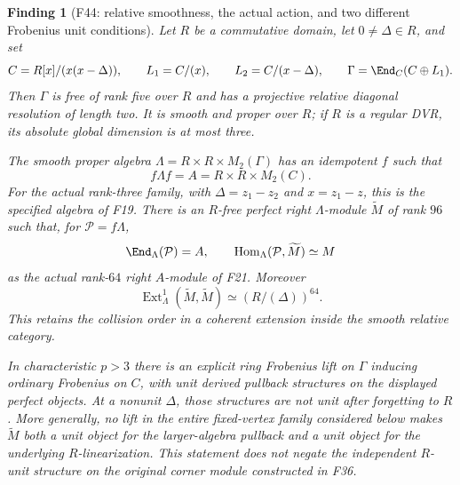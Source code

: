 \documentclass[11pt,a4paper]{article}
\newcommand{\fid}[1]{\textsf{#1}}\newcommand{\gate}[1]{\textsf{#1}}
\theoremstyle{named}\newtheorem{finding}{Finding}[section]
\theoremstyle{definition}\newtheorem{definition}[finding]{Definition}
\theoremstyle{remark}\newtheorem{remark}[finding]{Remark}
\begin{document}
\begin{finding}[\fid{F44}: relative smoothness, the actual action,
and two different Frobenius unit conditions]\label{f:relativeauslander}
Let $R$ be a commutative domain, let $0\ne\Delta\in R$, and set
\[
 C=R[x]/(x(x-\Delta)),\qquad L_1=C/(x),\qquad
 L_2=C/(x-\Delta),\qquad
 \Gamma=\End_C(C\oplus L_1).
\]
Then $\Gamma$ is free of rank five over $R$ and has a projective
relative diagonal resolution of length two. It is smooth and
proper over $R$; if $R$ is a regular DVR, its absolute global
dimension is at most three.

The smooth proper algebra
$\Lambda=R\times R\times M_2(\Gamma)$ has an idempotent $f$ such that
\[
 f\Lambda f=A=R\times R\times M_2(C).
\]
For the actual rank-three family, with $\Delta=z_1-z_2$ and
$x=z_1-z$, this is the specified algebra of \fid{F19}. There is an
$R$-free perfect right $\Lambda$-module $\widetilde M$ of rank
$96$ such that, for $\mathcal P=f\Lambda$,
\[
 \End_\Lambda(\mathcal P)=A,\qquad
 \operatorname{Hom}_\Lambda(\mathcal P,\widetilde M)
       \simeq M
\]
as the actual rank-$64$ right $A$-module of \fid{F21}.
Moreover
\[
 \operatorname{Ext}^1_\Lambda(\widetilde M,\widetilde M)
       \simeq(R/(\Delta))^{64}.
\]
This retains the collision order in a coherent extension inside
the smooth relative category.

In characteristic $p>3$ there is an explicit ring Frobenius lift
on $\Gamma$ inducing ordinary Frobenius on $C$, with unit
derived pullback structures on the displayed perfect objects.
At a nonunit $\Delta$, those structures are not unit after
forgetting to $R$. More generally, no lift in the entire
fixed-vertex family considered below makes $\widetilde M$
both a unit object for the larger-algebra pullback and a unit
object for the underlying $R$-linearization.
This statement does not negate the independent $R$-unit
structure on the original corner module constructed in
\fid{F36}.
\end{finding}
\end{document}
